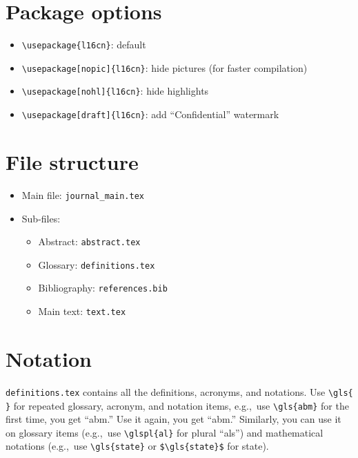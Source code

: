 
\section{Package options}
\begin{itemize}
	\item \verb|\usepackage{l16cn}|: default
	\item \verb|\usepackage[nopic]{l16cn}|: hide pictures (for faster compilation)
	\item \verb|\usepackage[nohl]{l16cn}|: hide highlights
	\item \verb|\usepackage[draft]{l16cn}|: add ``Confidential'' watermark
\end{itemize}

\section{File structure}
\begin{itemize}
	\item Main file: \verb|journal_main.tex|
	\item Sub-files:
	\begin{itemize}
		\item Abstract: \verb|abstract.tex|
		\item Glossary: \verb|definitions.tex|
		\item Bibliography: \verb|references.bib|
		\item Main text: \verb|text.tex|
	\end{itemize}
\end{itemize}

\section{Notation}
\verb|definitions.tex| contains all the 
definitions, acronyms, and notations.
Use \verb|\gls{ }| for
repeated glossary, acronym, and notation items, 
e.g.,~use \verb|\gls{abm}| for the first time,
you get ``\gls{abm}.'' Use it again, you get ``\gls{abm}.''
Similarly, you can use it on glossary items 
(e.g.,~use \verb|\glspl{al}| for plural ``\glspl{al}'')
and mathematical notations 
(e.g.,~use \verb|\gls{state}| or \verb|$\gls{state}$|
for \gls{state}).

